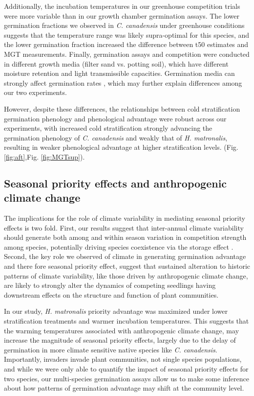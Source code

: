 \documentclass{article}\usepackage[]{graphicx}\usepackage[]{color}
\begin{document}
{Additionally, the incubation temperatures in our greenhouse competition trials were more variable than in our growth chamber germination  assays. The lower germination fractions we observed in \textit{C. canadensis} under greenhouse conditions suggests that the temperature range was likely supra-optimal for this species, and the lower germination fraction increased the difference between t50 estimates and MGT measurements. Finally, germination assays and competition were conducted in different growth media (filter sand vs. potting soil), which have different moisture retention and light transmissible  capacities. Germination media can strongly affect germination rates \citep{}, which may further explain differences among our two experiments.

However, despite these differences, the relationships between cold stratification germination phenology and phenological advantage were robust across our experiments, with increased cold stratification strongly advancing the germination phenology of \textit{C. canadensis} and weakly that of \textit{H. matronalis}, resulting in weaker phenological advantage at higher stratification levels. (Fig. \ref{fig:aft},Fig. \ref{fig:MGTsup}).

\subsection{Seasonal priority effects and anthropogenic climate change}
The implications for the role of climate variability in mediating seasonal priority effects is two fold. First, our results suggest that inter-annual climate variability should generate both among and within season variation in competition strength among species, potentially driving species coexistence via the storage effect \citep{}. Second, the key role we observed of climate in generating germination advantage and there fore seasonal priority effect, suggest that sustained alteration to historic patterns of climate variability, like those driven by anthropogenic climate change, are likely to strongly alter the dynamics of competing seedlings having downstream effects on the structure and function of plant communities.

In our study, \textit{H. matronalis} priority advantage was maximized under lower stratification treatments and warmer incubation temperatures. This suggests that the warming temperatures associated with anthropogenic climate change, may increase the magnitude of seasonal priority effects, largely due to the delay of germination in more climate sensitive native species like \textit{C. canadensis}.
Importantly, invaders invade plant communities, not single species populations, and while we were only able to quantify the impact of seasonal priority effects for two species, our multi-species germination assays allow us to make some inference about how patterns of germination advantage may shift at the community level.

}
\end{document}

